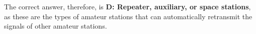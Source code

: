 The correct answer, therefore, is \textbf{D: Repeater, auxiliary, or space stations}, as these are the types of amateur stations that can automatically retransmit the signals of other amateur stations.

